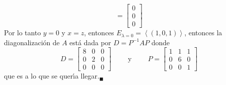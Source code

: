 \begin{solucion}
\begin{enumerate}[$a$)]
\begin{equation*}
   =
   \begin{bmatrix}
    0 \\ 0 \\ 0
   \end{bmatrix}
  \end{equation*}
  Por lo tanto $y = 0$ y $x=z$, entonces $E_{\lambda= 0} = \left< (1, 0, 1) \right>$, entonces la diagonalizaci\'on de $A$ est\'a dada por $D = P^{-1}AP$ donde
  \begin{equation*}
   D =
   \begin{bmatrix}
    8 & 0 & 0 \\
    0 & 2 & 0 \\
    0 & 0 & 0
   \end{bmatrix}
   \qquad \text{ y } \qquad 
   P = 
   \begin{bmatrix}
    1 & 1 & 1 \\
    0 & 6 & 0 \\
    0 & 0 & 1
   \end{bmatrix}
  \end{equation*}
  que es a lo que se quer\'{\i}a llegar.${}_{\blacksquare}$
 \end{enumerate}
\end{solucion}
